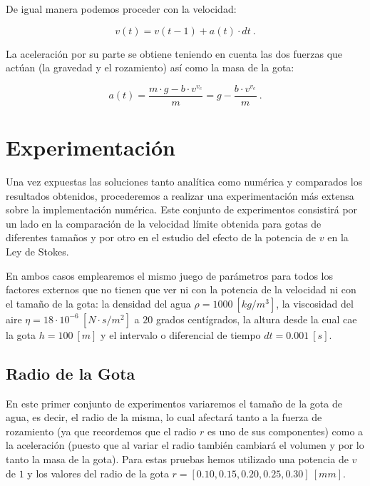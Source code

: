 \documentclass[journal]{IEEEtran}
\begin{document}
De igual manera podemos proceder con la velocidad:

\begin{equation}
  v(t) = v(t-1) + a(t) \cdot dt~.
\end{equation}

La aceleración por su parte se obtiene teniendo en cuenta las dos fuerzas que actúan (la gravedad y el rozamiento) así como la masa de la gota:

\begin{equation}
  a(t) = \displaystyle\frac{m\cdot g - b \cdot v^{v_e}}{m} = g - \displaystyle\frac{b\cdot v^{v_e}}{m}~.
\end{equation}

\section{Experimentación}

Una vez expuestas las soluciones tanto analítica como numérica y comparados los resultados obtenidos, procederemos a realizar una experimentación más extensa sobre la implementación numérica. Este conjunto de experimentos consistirá por un lado en la comparación de la velocidad límite obtenida para gotas de diferentes tamaños y por otro en el estudio del efecto de la potencia de $v$ en la Ley de Stokes.

En ambos casos emplearemos el mismo juego de parámetros para todos los factores externos que no tienen que ver ni con la potencia de la velocidad ni con el tamaño de la gota: la densidad del agua $\rho = 1000~[kg/m^3]$, la viscosidad del aire $\eta = 18 \cdot 10^{-6}~[N\cdot s/m^2]$ a $20$ grados centígrados, la altura desde la cual cae la gota $h = 100~[m]$ y el intervalo o diferencial de tiempo $dt = 0.001~[s]$.

\subsection{Radio de la Gota}

En este primer conjunto de experimentos variaremos el tamaño de la gota de agua, es decir, el radio de la misma, lo cual afectará tanto a la fuerza de rozamiento (ya que recordemos que el radio $r$ es uno de sus componentes) como a la aceleración (puesto que al variar el radio también cambiará el volumen y por lo tanto la masa de la gota). Para estas pruebas hemos utilizado una potencia de $v$ de $1$ y los valores del radio de la gota $r = [0.10, 0.15, 0.20, 0.25, 0.30]~[mm]$.
\end{document}
